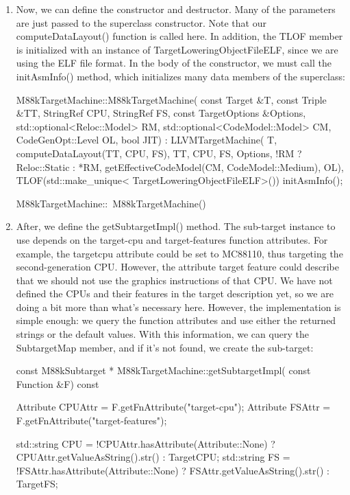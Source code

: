 \begin{enumerate}
\item
Now, we can define the constructor and destructor. Many of the parameters are just passed to the superclass constructor. Note that our computeDataLayout() function is called here. In addition, the TLOF member is initialized with an instance of TargetLoweringObjectFileELF, since we are using the ELF file format. In the body of the constructor, we must call the initAsmInfo() method, which initializes many data members of the superclass:

\begin{cpp}
M88kTargetMachine::M88kTargetMachine(
    const Target &T, const Triple &TT, StringRef CPU,
    StringRef FS, const TargetOptions &Options,
    std::optional<Reloc::Model> RM,
    std::optional<CodeModel::Model> CM,
    CodeGenOpt::Level OL, bool JIT)
    : LLVMTargetMachine(
        T, computeDataLayout(TT, CPU, FS), TT, CPU,
        FS, Options, !RM ? Reloc::Static : *RM,
        getEffectiveCodeModel(CM, CodeModel::Medium),
        OL),
    TLOF(std::make_unique<
        TargetLoweringObjectFileELF>()) {
    initAsmInfo();
}

M88kTargetMachine::~M88kTargetMachine() {}
\end{cpp}

\item
After, we define the getSubtargetImpl() method. The sub-target instance to use depends on the target-cpu and target-features function attributes. For example, the targetcpu attribute could be set to MC88110, thus targeting the second-generation CPU. However, the attribute target feature could describe that we should not use the graphics instructions of that CPU. We have not defined the CPUs and their features in the target description yet, so we are doing a bit more than what’s necessary here. However, the implementation is simple enough: we query the function attributes and use either the returned strings or the default values. With this information, we can query the SubtargetMap member, and if it’s not found, we create the sub-target:

\begin{cpp}
const M88kSubtarget *
M88kTargetMachine::getSubtargetImpl(
        const Function &F) const {
    Attribute CPUAttr = F.getFnAttribute("target-cpu");
    Attribute FSAttr =
        F.getFnAttribute("target-features");

    std::string CPU =
        !CPUAttr.hasAttribute(Attribute::None)
            ? CPUAttr.getValueAsString().str()
            : TargetCPU;
    std::string FS = !FSAttr.hasAttribute(Attribute::None)
                        ? FSAttr.getValueAsString().str()
                        : TargetFS;

}
\end{cpp}
\end{enumerate}
